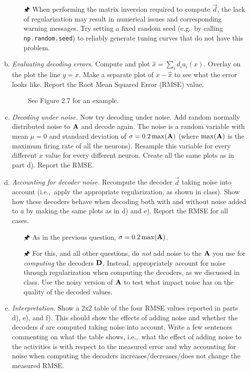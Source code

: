 \begin{enumerate}[a)]
		\begin{itemize}
			\item[{\symbolfont 🖈}] When performing the matrix inversion required to compute $\vec d$, the lack of regularization may result in numerical issues and corresponding warning messages. Try setting a fixed random seed (e.g.~by calling \texttt{np.random.seed}) to reliably generate tuning curves that do not have this problem.
		\end{itemize}
		\item {} \textit{Evaluating decoding errors.} Compute and plot $\hat{x}=\sum_i d_i a_i(x)$. Overlay on the plot the line $y=x$. Make a separate plot of $x-\hat{x}$ to see what the error looks like. Report the Root Mean Squared Error (RMSE) value.
		\begin{itemize}
			\item[{\symbolfont 📖}] See Figure 2.7 for an example.
		\end{itemize}
		\item {} \textit{Decoding under noise.} Now try decoding under noise. Add random normally distributed noise to ${\mathbf{A}}$ and decode again. The noise is a random variable with mean $\mu=0$ and standard deviation of $\sigma=0.2 \max({\mathbf{A}})$ (where $\max({\mathbf{A}})$ is the maximum firing rate of all the neurons). Resample this variable for every different $x$ value for every different neuron. Create all the same plots as in part d). Report the RMSE.
		\item {} \textit{Accounting for decoder noise.} Recompute the decoder $\vec d$ taking noise into account (i.e.,~apply the appropriate regularization, as shown in class). Show how these decoders behave when decoding both with and without noise added to $a$ by making the same plots as in d) and e). Report the RMSE for all cases.
		\begin{itemize}
			\item[{\symbolfont 🖈}] As in the previous question, $\sigma = 0.2 \max({\mathbf{A}})$.
			\item[{\symbolfont 🖈}] For this, and all other questions, do \textit{not} add noise to the ${\mathbf{A}}$ you use for \emph{computing} the decoders ${\mathbf{D}}$. Instead, appropriately account for noise through regularization when computing the decoders, as we discussed in class. Use the noisy version of ${\mathbf{A}}$ to test what impact noise has on the quality of the decoded values.
		\end{itemize}
		\item {} \textit{Interpretation.} Show a 2x2 table of the four RMSE values reported in parts d), e), and f). This should show the effects of adding noise and whether the decoders $d$ are computed taking noise into account. Write a few sentences commenting on what the table shows, i.e.,~what the effect of adding noise to the activities is with respect to the measured error and why accounting for noise when computing the decoders increases/decreases/does not change the measured RMSE.
	\end{enumerate}

